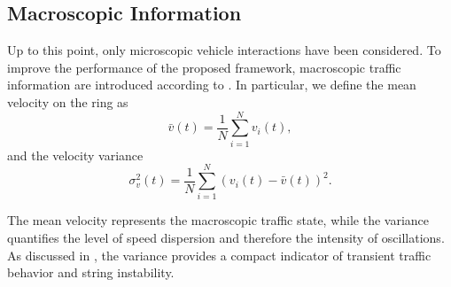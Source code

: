 \subsection{Macroscopic Information}

Up to this point, only microscopic vehicle interactions have been considered. To improve the performance of the proposed framework, macroscopic traffic information are introduced according to \cite{Mirabilio.2023}. In particular, we define the mean velocity on the ring as
\begin{equation}
\bar v(t) = \frac{1}{N} \sum_{i=1}^{N} v_i(t),
\end{equation}
and the velocity variance
\begin{equation}
\sigma_v^2(t)
=
\frac{1}{N}
\sum_{i=1}^{N}
\left( v_i(t) - \bar v(t) \right)^2.
\end{equation}

The mean velocity represents the macroscopic traffic state, while the variance quantifies the level of speed dispersion and therefore the intensity of oscillations. As discussed in \cite{Mirabilio.2023}, the variance provides a compact indicator of transient traffic behavior and string instability.

